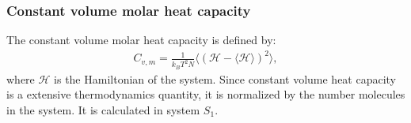 \documentclass[aip,jcp,a4paper,preprint,unsortedaddress,onecolumn,fleqn]{revtex4-1}
\newcommand{\systemsb}{S_1}
\begin{document}

\subsubsection{Constant volume molar heat capacity}
The constant volume molar heat capacity is defined by:
\begin{align}
  C_{v,m} = \frac{1}{k_BT^2 N} \langle (\mathcal H - \langle\mathcal H\rangle)^2 \rangle,
\end{align}
where $\mathcal H$ is the Hamiltonian of the system. Since constant
volume heat capacity is a extensive thermodynamics quantity, it is
normalized by the number molecules in the system.
It is calculated in system $\systemsb$.
\end{document}

